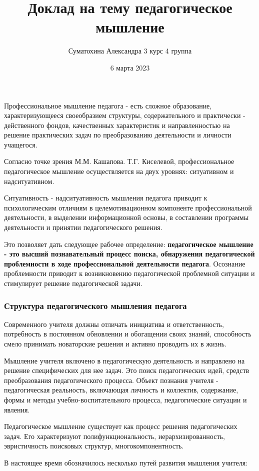\documentclass[a4paper, 12pt]{extarticle}
\title{Доклад на тему педагогическое мышление}
\author{Суматохина Александра 3 курс 4 группа}
\date{6 марта 2023}
\begin{document}
\maketitle

Профессиональное мышление педагога - есть сложное образование, характеризующееся своеобразием структуры, содержательного и практически - действенного фондов, качественных характеристик и направленностью на решение практических задач по преобразованию деятельности и личности учащегося.

Согласно точке зрения М.М. Кашапова. Т.Г. Киселевой, профессиональное педагогическое мышление осуществляется на двух уровнях: ситуативном и надситуативном. 

Ситуативность - надситуативность мышления педагога приводит к психологическим отличиям в целемотивационном компоненте профессиональной деятельности, в выделении информационной основы, в составлении программы деятельности и принятии педагогического решения.

Это позволяет дать следующее рабочее определение: \textbf{педагогическое мышление - это высший познавательный процесс поиска, обнаружения педагогической проблемности в ходе профессиональной деятельности педагога}. Осознание проблемности приводит к возникновению педагогической проблемной ситуации и стимулирует решение педагогической задачи.

\subsubsection*{Структура педагогического мышления педагога}

Современного учителя должны отличать инициатива и ответственность, потребность в постоянном обновлении и обогащении своих знаний, способность смело принимать новаторские решения и активно проводить их в жизнь.

Мышление учителя включено в педагогическую деятельность и направлено на решение специфических для нее задач. Это поиск педагогических идей, средств преобразования педагогического процесса. Объект познания учителя - педагогическая реальность, включающая личность и коллектив, содержание, формы и методы учебно-воспитательного процесса, педагогические ситуации и явления.

Педагогическое мышление существует как процесс решения педагогических задач. Его характеризуют полифункциональность, иерархизированность, эвристичность поисковых структур, многокомпонентность.

В настоящее время обозначилось несколько путей развития мышления учителя: 
\end{document}
